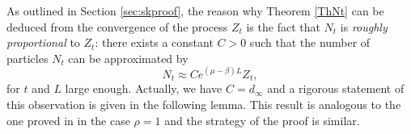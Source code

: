\documentclass[11pt]{article}
\theoremstyle{plain}
\newtheorem{rem}[lemma]{Remark}
\begin{document}


As outlined in Section \ref{sec:skproof}, the reason why Theorem \ref{ThNt} can be deduced from the convergence of the process $Z_t$ is the fact that $N_t$ is \textit{roughly proportional} to $Z_t$: there exists a constant $C>0$ such that the number of particles $N_t$ can be approximated by 
\begin{equation*}
N_t\approx Ce^{(\mu-\beta)L}Z_t,
\end{equation*}
for $t$ and $L$ large enough. Actually, we have $C=d_\infty$ and a rigorous statement of this observation is given in the following lemma. This result is analogous to the one proved in \cite[Section 6.3]{Berestycki2010} in the case $\rho=1$ and the strategy of the proof is similar.
\end{document}
